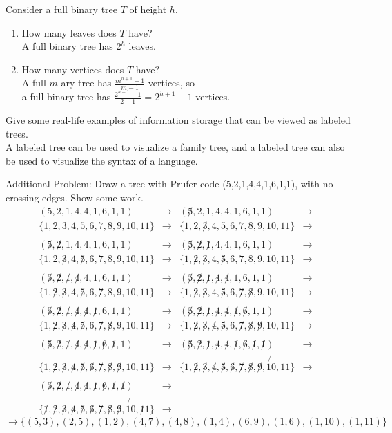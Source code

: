 \documentclass[12pt]{article}
\newcommand{\be}{\begin{enumerate}}
\newcommand{\ee}{\end{enumerate}}
\newcommand{\seti}[1]{\setcounter{enumi}{#1}}
\begin{document}
\seti{9}
\item Consider a full binary tree $T$ of height $h$.
	\be
	\item How many leaves does $T$ have?\\
	A full binary tree has $2^h$ leaves.
	\item How many vertices does $T$ have?\\
	A full $m$-ary tree has $\frac{m^{h+1}-1}{m-1}$ vertices, so\\
	a full binary tree has $\frac{2^{h+1}-1}{2-1}=2^{h+1}-1$ vertices.
	\ee

\seti{11}
\item Give some real-life examples of information storage that can be viewed as labeled trees.\\
A labeled tree can be used to visualize a family tree, and a labeled tree can also be used to visualize the syntax of a language.

\seti{0}
\item Additional Problem: Draw a tree with Prufer code (5,2,1,4,4,1,6,1,1), with no crossing edges. Show some work.
	\begin{align*}
	(5,2,1,4,4,1,6,1,1) &\to& 
	(\not5,2,1,4,4,1,6,1,1) &\to& 
	\\
	\{1,2,3,4,5,6,7,8,9,10,11\} &\to& 
	\{1,2,\not3,4,5,6,7,8,9,10,11\} &\to& 
	\\
	\\
	(\not5,\not2,1,4,4,1,6,1,1) &\to&
	(\not5,\not2,\not1,4,4,1,6,1,1) &\to& 
	\\
	\{1,2,\not3,4,\not5,6,7,8,9,10,11\} &\to&
	\{1,\not2,\not3,4,\not5,6,7,8,9,10,11\} &\to& 
	\\
	\\
	(\not5,\not2,\not1,\not4,4,1,6,1,1) &\to& 
	(\not5,\not2,\not1,\not4,\not4,1,6,1,1) &\to&
	\\
	\{1,\not2,\not3,4,\not5,6,\not7,8,9,10,11\} &\to&
	\{1,\not2,\not3,4,\not5,6,\not7,\not8,9,10,11\} &\to&
	\\ 
	\\
	(\not5,\not2,\not1,\not4,\not4,\not1,6,1,1) &\to& 
	(\not5,\not2,\not1,\not4,\not4,\not1,\not6,1,1) &\to& 
	\\
	\{1,\not2,\not3,\not4,\not5,6,\not7,\not8,9,10,11\} &\to& 
	\{1,\not2,\not3,\not4,\not5,6,\not7,\not8,\not9,10,11\} &\to&
	\\
	\\
	(\not5,\not2,\not1,\not4,\not4,\not1,\not6,\not1,1) &\to&
	(\not5,\not2,\not1,\not4,\not4,\not1,\not6,\not1,\not1) &\to&
	\\
	\{1,\not2,\not3,\not4,\not5,\not6,\not7,\not8,\not9,10,11\} &\to&
	\{1,\not2,\not3,\not4,\not5,\not6,\not7,\not8,\not9,\not{10},11\} &\to&
	\\
	\\
	(\not5,\not2,\not1,\not4,\not4,\not1,\not6,\not1,\not1) &\to&
	\\
	\{\not1,\not2,\not3,\not4,\not5,\not6,\not7,\not8,\not9,\not{10},\not11\} &\to&
	\end{align*}
	\[
	\to\{(5,3),(2,5),(1,2),(4,7),(4,8),(1,4),(6,9),(1,6),(1,10),(1,11)\}
	\]
	
\end{document}
